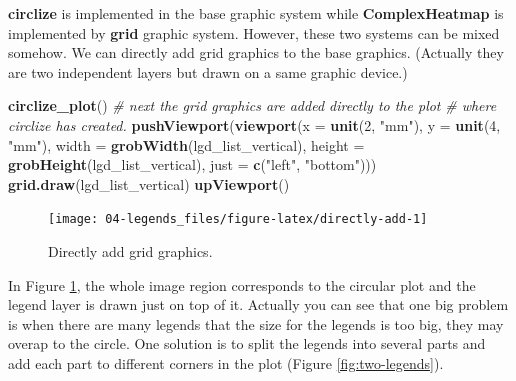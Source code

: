\documentclass[]{book}
\newenvironment{Shaded}{\begin{snugshade}}{\end{snugshade}}
\newcommand{\KeywordTok}[1]{\textcolor[rgb]{0.13,0.29,0.53}{\textbf{#1}}}
\newcommand{\DataTypeTok}[1]{\textcolor[rgb]{0.13,0.29,0.53}{#1}}
\newcommand{\DecValTok}[1]{\textcolor[rgb]{0.00,0.00,0.81}{#1}}
\newcommand{\StringTok}[1]{\textcolor[rgb]{0.31,0.60,0.02}{#1}}
\newcommand{\CommentTok}[1]{\textcolor[rgb]{0.56,0.35,0.01}{\textit{#1}}}
\newcommand{\NormalTok}[1]{#1}
\theoremstyle{definition}
\theoremstyle{definition}
\theoremstyle{remark}
\begin{document}
\textbf{circlize} is implemented in the base graphic system while
\textbf{ComplexHeatmap} is implemented by \textbf{grid} graphic system.
However, these two systems can be mixed somehow. We can directly add
grid graphics to the base graphics. (Actually they are two independent
layers but drawn on a same graphic device.)

\begin{Shaded}
\begin{Highlighting}[]
\KeywordTok{circlize_plot}\NormalTok{()}
\CommentTok{# next the grid graphics are added directly to the plot}
\CommentTok{# where circlize has created.}
\KeywordTok{pushViewport}\NormalTok{(}\KeywordTok{viewport}\NormalTok{(}\DataTypeTok{x =} \KeywordTok{unit}\NormalTok{(}\DecValTok{2}\NormalTok{, }\StringTok{"mm"}\NormalTok{), }\DataTypeTok{y =} \KeywordTok{unit}\NormalTok{(}\DecValTok{4}\NormalTok{, }\StringTok{"mm"}\NormalTok{), }
    \DataTypeTok{width =} \KeywordTok{grobWidth}\NormalTok{(lgd_list_vertical), }
    \DataTypeTok{height =} \KeywordTok{grobHeight}\NormalTok{(lgd_list_vertical), }
    \DataTypeTok{just =} \KeywordTok{c}\NormalTok{(}\StringTok{"left"}\NormalTok{, }\StringTok{"bottom"}\NormalTok{)))}
\KeywordTok{grid.draw}\NormalTok{(lgd_list_vertical)}
\KeywordTok{upViewport}\NormalTok{()}
\end{Highlighting}
\end{Shaded}

\begin{figure}

{\centering \texttt{[image: 04-legends\_files/figure-latex/directly-add-1]} 

}

\caption{Directly add grid graphics.}\label{fig:directly-add}
\end{figure}

In Figure \ref{fig:directly-add}, the whole image region corresponds to
the circular plot and the legend layer is drawn just on top of it.
Actually you can see that one big problem is when there are many legends
that the size for the legends is too big, they may overap to the circle.
One solution is to split the legends into several parts and add each
part to different corners in the plot (Figure \ref{fig:two-legends}).
\end{document}
